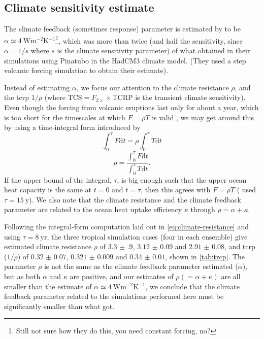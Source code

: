 \documentclass{ametsocV5}
\begin{document}
\subsection{Climate sensitivity estimate}

The climate feedback (sometimes response) parameter is estimated by \citet{jones2005} to
be \(\alpha \simeq \SI{4}{\watt\metre^{-2}\kelvin^{-1}}\)\footnote{Still not sure how
  they do this, you need constant forcing, no?}, which was more than twice (and half the
sensitivity, since \(\alpha =1/s\) where \(s\) is the climate sensitivity parameter) of
what \citet{gregory2016} obtained in their simulations using Pinatubo in the HadCM3
climate model. (They used a step volcanic forcing simulation to obtain their estimate).

Instead of estimating \(\alpha \), we focus our attention to the climate resistance
\(\rho \), and the \ac{tcrp} \(1/\rho\) (where \(\mathrm{TCS}=F_{2\times}\times
\mathrm{TCRP}\) is the transient climate sensitivity). Even though the forcing from
volcanic eruptions last only for about a year, which is too short for the timescales at
which \(F=\rho T\) is valid \citep{gregory2016}, we may get around this by using a
time-integral form introduced by \citet{merlis2014}
\begin{equation}
  \int_0^{\tau}F \mathrm{d}t=\rho\int_{0}^{\tau}T \mathrm{d}t
\end{equation}
\begin{equation}
  \rho=\frac{\int_0^{\tau}F \mathrm{d}t}{\int_{0}^{\tau}T \mathrm{d}t}.
  \label{eq:climate-resistance}
\end{equation}
%
If the upper bound of the integral, \(\tau \), is big enough such that the upper ocean
heat capacity is the same at \(t=0\) and \(t=\tau \), then this agrees with \(F=\rho T\)
\citep{gregory2016} (\citet{merlis2014} used \(\tau =\SI{15}{\mathrm{y}}\)). We also
note that the climate resistance and the climate feedback parameter are related to the
ocean heat uptake efficiency \(\kappa \) through \(\rho =\alpha +\kappa \).

Following the integral-form computation laid out in \cref{eq:climate-resistance} and
using \(\tau =\SI{8}{\mathrm{yr}}\), the three tropical simulation cases (four in each
ensemble) give estimated climate resistance \(\rho \) of \(\num{3.3(9)}\),
\(\num{3.12(9)}\) and \(\num{2.91(8)}\), and \ac{tcrp} (\(1/\rho\)) of
\(\num{0.32(7)}\), \(\num{0.321(9)}\) and \(\num{0.34(1)}\), shown in \cref{tab:trcp}.
The parameter \(\rho\) is not the same as the climate feedback parameter
\citet{jones2005} estimated (\(\alpha\)), but as both \(\alpha \) and \(\kappa \) are
positive, and our estimates of \(\rho (=\alpha +\kappa) \) are all smaller than the
\citet{jones2005} estimate of \(\alpha \simeq \SI{4}{\watt\metre^{-2}\kelvin^{-1}}\), we
conclude that the climate feedback parameter related to the simulations performed here
must be significantly smaller than what \citet{jones2005} got.
\end{document}
